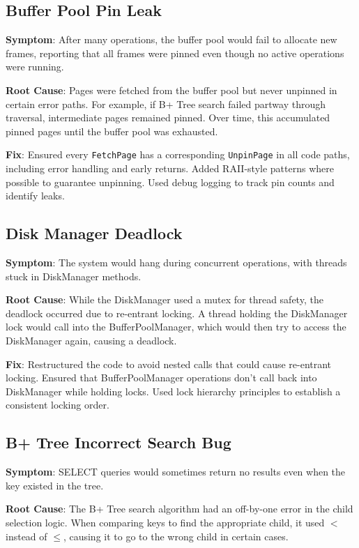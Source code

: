 \documentclass{article}
\begin{document}
\subsection{Buffer Pool Pin Leak}

\textbf{Symptom}: After many operations, the buffer pool would fail to allocate new frames, reporting that all frames were pinned even though no active operations were running.

\textbf{Root Cause}: Pages were fetched from the buffer pool but never unpinned in certain error paths. For example, if B+ Tree search failed partway through traversal, intermediate pages remained pinned. Over time, this accumulated pinned pages until the buffer pool was exhausted.

\textbf{Fix}: Ensured every \texttt{FetchPage} has a corresponding \texttt{UnpinPage} in all code paths, including error handling and early returns. Added RAII-style patterns where possible to guarantee unpinning. Used debug logging to track pin counts and identify leaks.

\subsection{Disk Manager Deadlock}

\textbf{Symptom}: The system would hang during concurrent operations, with threads stuck in DiskManager methods.

\textbf{Root Cause}: While the DiskManager used a mutex for thread safety, the deadlock occurred due to re-entrant locking. A thread holding the DiskManager lock would call into the BufferPoolManager, which would then try to access the DiskManager again, causing a deadlock.

\textbf{Fix}: Restructured the code to avoid nested calls that could cause re-entrant locking. Ensured that BufferPoolManager operations don't call back into DiskManager while holding locks. Used lock hierarchy principles to establish a consistent locking order.

\subsection{B+ Tree Incorrect Search Bug}

\textbf{Symptom}: SELECT queries would sometimes return no results even when the key existed in the tree.

\textbf{Root Cause}: The B+ Tree search algorithm had an off-by-one error in the child selection logic. When comparing keys to find the appropriate child, it used $<$ instead of $\leq$, causing it to go to the wrong child in certain cases.
\end{document}
